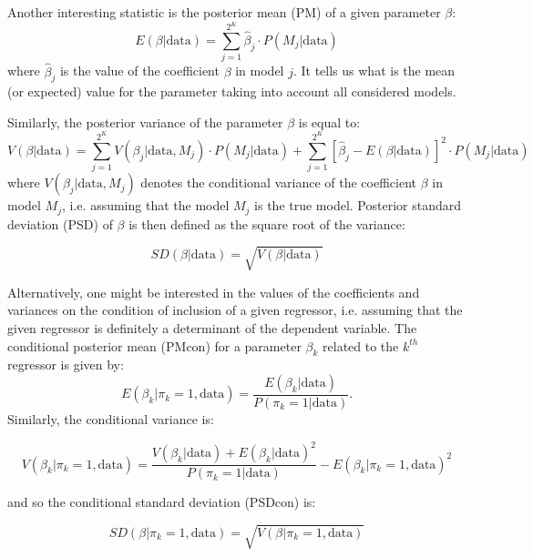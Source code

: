 \documentclass[a4paper]{article}
\begin{document}
Another interesting statistic is the posterior mean (PM) of a given parameter $\beta$:
\begin{equation}\label{pm}
E(\beta|\text{data})=\sum_{j=1}^{2^K}\widehat{\beta}_{j} \cdot P(M_{j}|\text{data})
\end{equation}
\noindent where $\widehat{\beta}_{j}$ is the value of the coefficient $\beta$ in model $j$.
It tells us what is the mean (or expected) value for the parameter taking into account all considered models.

Similarly, the posterior variance of the parameter $\beta$ is equal to:
\begin{equation}
V(\beta|\text{data})=\sum_{j=1}^{2^K}V(\beta_{j}|\text{data},M_{j}) \cdot P(M_{j}|\text{data})+\sum_{j=1}^{2^K}[\widehat{\beta}_{j}-E(\beta|\text{data})]^{2} \cdot P(M_{j}|\text{data})
\end{equation}
\noindent where $V(\beta_{j}|\text{data},M_{j})$ denotes the conditional variance of the coefficient $\beta$ in model $M_{j}$,
i.e. assuming that the model $M_j$ is the true model.
Posterior standard deviation (PSD) of $\beta$ is then defined as the square root of the variance:

\begin{equation}\label{psd}
SD(\beta | \text{data}) = \sqrt{ V(\beta | \text{data}) }
\end{equation}

\indent Alternatively, one might be interested in the values of the coefficients and variances on the condition of inclusion of a given regressor,
i.e. assuming that the given regressor is definitely a determinant of the dependent variable.
The conditional posterior mean (PMcon) for a parameter $\beta_k$ related to the $k^{th}$ regressor is given by:
\begin{equation}
E(\beta_{k}|\pi_{k}=1,\text{data})=\frac{E(\beta_{k}|\text{data})}{P(\pi_k = 1|\text{data})}.
\end{equation}
Similarly, the conditional variance is:

\begin{equation}
    V(\beta_{k}|\pi_{k}=1,\text{data})=\frac{V(\beta_{k}|\text{data})+E(\beta_{k}|\text{data})^2}{P(\pi_{k}=1|\text{data})}-E(\beta_{k}|\pi_{k}=1,\text{data})^2
\end{equation}

\noindent and so the conditional standard deviation (PSDcon) is:

\begin{equation}
SD(\beta | \pi_{k}=1,\text{data}) = \sqrt{ V(\beta | \pi_{k}=1,\text{data}) }
\end{equation}
\end{document}
